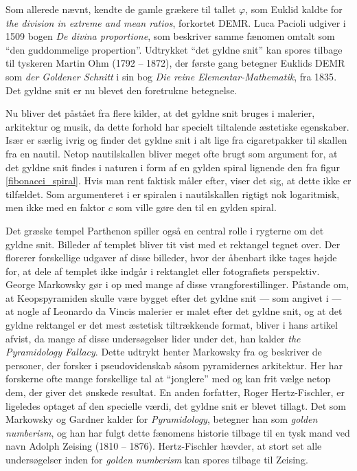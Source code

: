{
Som allerede nævnt, kendte de gamle grækere til tallet $\varphi$, som
Euklid kaldte for \emph{the division in extreme and mean ratios},
forkortet DEMR. Luca Pacioli udgiver i 1509 bogen \emph{De divina
proportione}, som beskriver samme fænomen omtalt som ``den guddommelige
propertion''. Udtrykket ``det gyldne snit'' kan spores tilbage til
tyskeren Martin Ohm (1792 -- 1872), der første gang betegner Euklids DEMR
som \emph{der Goldener Schnitt} i sin bog \emph{Die reine
Elementar-Mathematik}, fra 1835\cite{Markowsky1992}. Det gyldne snit er
nu blevet den foretrukne betegnelse.

Nu bliver det påstået fra flere kilder, at det gyldne snit bruges i
malerier, arkitektur og musik, da dette forhold har specielt tiltalende
æstetiske
egenskaber\cite{GoldenNumber,RatioArt,Putz1995,Stakhov2006490,Boussora2004}.
Især \cite{GoldenNumber} er særlig ivrig og finder det gyldne snit i alt
lige fra cigaretpakker til skallen fra en nautil. Netop nautilskallen
bliver meget ofte brugt som argument for, at det gyldne snit findes i
naturen i form af en gylden spiral lignende den fra figur
\ref{fibonacci_spiral}. Hvis man rent faktisk måler efter,
viser det sig, at dette ikke er tilfældet. Som argumenteret i
\cite{Sharp2002} er spiralen i nautilskallen rigtigt nok logaritmisk,
men ikke med en faktor $c$ som ville gøre den til en gylden spiral.

Det græske tempel Parthenon spiller også en central rolle i rygterne om
det gyldne snit. Billeder af templet bliver tit vist med et rektangel
tegnet over. Der florerer forskellige udgaver af disse billeder, hvor
der åbenbart ikke tages højde for, at dele af templet ikke indgår i
rektanglet eller fotografiets perspektiv. George Markowsky gør i
\cite{Markowsky1992} op med mange af disse vrangforestillinger. Påstande
om, at Keopspyramiden skulle være bygget efter det gyldne snit --- som
angivet i \cite{Stakhov2006490} --- at nogle af Leonardo da Vincis malerier
er malet efter det gyldne snit, og at det gyldne rektangel er det mest
æstetisk tiltrækkende format\cite{GoldenNumber,RatioArt}, bliver i
hans artikel afvist, da mange af disse undersøgelser lider under det, han
kalder \emph{the Pyramidology Fallacy}. Dette udtrykt henter Markowsky
fra \cite{Gardner1952_2} og beskriver de personer, der forsker i
pseudovidenskab såsom pyramidernes arkitektur. Her har forskerne ofte
mange forskellige tal at ``jonglere'' med og kan frit vælge netop dem,
der giver det ønskede resultat. En anden forfatter, Roger
Hertz-Fischler, er ligeledes optaget af den specielle værdi, det gyldne
snit er blevet tillagt. Det som Markowsky og Gardner kalder for
\emph{Pyramidology}, betegner han som \emph{golden numberism}, og han har
fulgt dette fænomens historie tilbage til en tysk mand ved navn
Adolph Zeising (1810 -- 1876)\cite{Herz-Fischler2005}. Hertz-Fischler
hævder, at stort set alle undersøgelser inden for \emph{golden numberism}
kan spores tilbage til Zeising.

}
